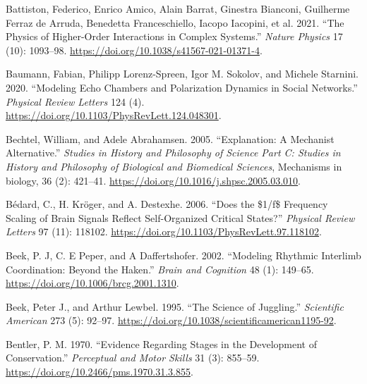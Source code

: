 \documentclass[
  a4paper,
  DIV=11,
  numbers=noendperiod]{scrreprt}
\newlength{\cslhangindent}
\newlength{\cslentryspacingunit} %
\newenvironment{CSLReferences}[2] %
 {%
  \setlength{\parindent}{0pt}
  \ifodd #1
  \let\oldpar\par
  \def\par{\hangindent=\cslhangindent\oldpar}
  \fi
  \setlength{\parskip}{#2\cslentryspacingunit}
 }%
 {}
\begin{document}
\begin{CSLReferences}{1}{0}
\leavevmode{}%
Battiston, Federico, Enrico Amico, Alain Barrat, Ginestra Bianconi,
Guilherme Ferraz de Arruda, Benedetta Franceschiello, Iacopo Iacopini,
et al. 2021. {``The Physics of Higher-Order Interactions in Complex
Systems.''} \emph{Nature Physics} 17 (10): 1093--98.
\url{https://doi.org/10.1038/s41567-021-01371-4}.

\leavevmode{}%
Baumann, Fabian, Philipp Lorenz-Spreen, Igor M. Sokolov, and Michele
Starnini. 2020. {``Modeling {Echo Chambers} and {Polarization Dynamics}
in {Social Networks}.''} \emph{Physical Review Letters} 124 (4).
\url{https://doi.org/10.1103/PhysRevLett.124.048301}.

\leavevmode{}%
Bechtel, William, and Adele Abrahamsen. 2005. {``Explanation: A
Mechanist Alternative.''} \emph{Studies in History and Philosophy of
Science Part C: Studies in History and Philosophy of Biological and
Biomedical Sciences}, Mechanisms in biology, 36 (2): 421--41.
\url{https://doi.org/10.1016/j.shpsc.2005.03.010}.

\leavevmode{}%
Bédard, C., H. Kröger, and A. Destexhe. 2006. {``Does the \$1/f\$
{Frequency Scaling} of {Brain Signals Reflect Self-Organized Critical
States}?''} \emph{Physical Review Letters} 97 (11): 118102.
\url{https://doi.org/10.1103/PhysRevLett.97.118102}.

\leavevmode{}%
Beek, P. J, C. E Peper, and A Daffertshofer. 2002. {``Modeling {Rhythmic
Interlimb Coordination}: {Beyond} the
{Haken}.''} \emph{Brain and
Cognition} 48 (1): 149--65.
\url{https://doi.org/10.1006/brcg.2001.1310}.

\leavevmode{}%
Beek, Peter J., and Arthur Lewbel. 1995. {``The {Science} of
{Juggling}.''} \emph{Scientific American} 273 (5): 92--97.
\url{https://doi.org/10.1038/scientificamerican1195-92}.

\leavevmode{}%
Bentler, P. M. 1970. {``Evidence Regarding {Stages} in the {Development}
of {Conservation}.''} \emph{Perceptual and Motor Skills} 31 (3):
855--59. \url{https://doi.org/10.2466/pms.1970.31.3.855}.


\end{CSLReferences}
\end{document}
